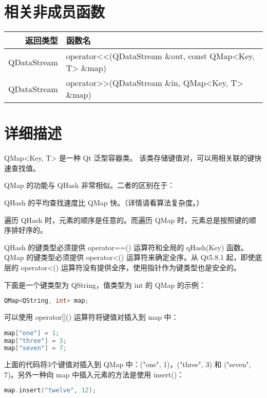 \section{相关非成员函数}

\begin{longtable}{|r|l|}
\hline
返回类型  & 	函数名 \\
\hline
QDataStream &	operator<<(QDataStream \&out, const QMap<Key, T> \&map) \\ 
\hline
QDataStream &	operator>>(QDataStream \&in, QMap<Key, T> \&map) \\  
\hline
\end{longtable}

\section{详细描述}

QMap<Key, T> 是一种 Qt 泛型容器类。
该类存储键值对，可以用相关联的键快速查找值。

QMap 的功能与 QHash 非常相似。二者的区别在于：

\begin{compactitem}
\item QHash 的平均查找速度比 QMap 快。（详情请看算法复杂度。）
\item 遍历 QHash 时，元素的顺序是任意的。而遍历 QMap 时，元素总是按照键的顺序排好序的。
\item QHash 的键类型必须提供 operator==() 运算符和全局的 qHash(Key) 函数。QMap 的键类型必须提供 operator<() 运算符来确定全序。从 Qt5.8.1 起，即使底层的 operator<() 运算符没有提供全序，使用指针作为键类型也是安全的。
\end{compactitem}

下面是一个键类型为 QString，值类型为 int 的 QMap 的示例：

\begin{lstlisting}[language=C++]
QMap<QString, int> map;
\end{lstlisting}

可以使用 operator[]() 运算符将键值对插入到 map 中：

\begin{lstlisting}[language=C++]
map["one"] = 1;
map["three"] = 3;
map["seven"] = 7;
\end{lstlisting}


上面的代码将3个键值对插入到 QMap 中：("one", 1)，("three", 3) 和 ("seven", 7)。另外一种向 map 中插入元素的方法是使用 insert()：

\begin{lstlisting}[language=C++]
map.insert("twelve", 12);
\end{lstlisting}


